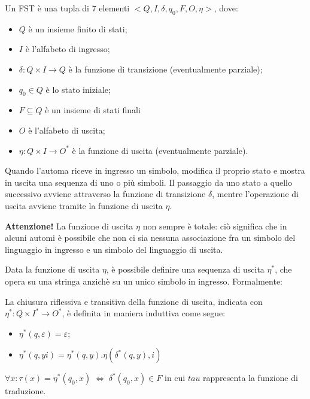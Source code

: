     \begin{definition}
      Un FST è una tupla di 7 elementi \(<Q, I, \delta, q_0, F, O, \eta>\), dove:
      \begin{itemize}
        \item \(Q\) è un insieme finito di stati;
        \item \(I\) è l'alfabeto di ingresso;
        \item \(\delta:Q\times I\to Q\) è la funzione di transizione (eventualmente parziale);
        \item \(q_0\in Q\) è lo stato iniziale;
        \item \(F\subseteq Q\) è un insieme di stati finali
        \item \(O\) è l'alfabeto di uscita;
        \item \(\eta:Q\times I \to O^*\) è la funzione di uscita (eventualmente parziale).
      \end{itemize}
    \end{definition}
    Quando l'automa riceve in ingresso un simbolo, modifica il proprio stato  e mostra in uscita una sequenza di uno o più simboli. Il passaggio da uno stato a quello successivo avviene attraverso la funzione di transizione \(\delta\), mentre l'operazione di uscita avviene tramite la funzione di uscita \(\eta\). 

    \textbf{Attenzione!} La funzione di uscita \(\eta\) non sempre è totale: ciò significa che in alcuni automi è possibile che non ci sia nessuna associazione fra un simbolo del linguaggio in ingresso e un simbolo del linguaggio di uscita.

    Data la funzione di uscita \(\eta\), è possibile definire una sequenza di uscita \(\eta^*\), che opera su una stringa anzichè su un unico simbolo in ingresso. Formalmente:

    \begin{definition}
      La chiusura riflessiva e transitiva della funzione di uscita, indicata con \(\eta^*:Q\times I^* \to O^*\), è definita in maniera induttiva come segue:
      \begin{itemize}
        \item \(\eta^*(q, \varepsilon) = \varepsilon\);
        \item \(\eta^*(q, yi) = \eta^*(q, y).\eta(\delta^*(q,y),i)\)
      \end{itemize}
      \(\forall x : \tau(x)=\eta^*(q_0,x)\; \Leftrightarrow \; \delta^*(q_0,x) \in F\) in cui \(tau\) rappresenta la funzione di traduzione.
    \end{definition}


